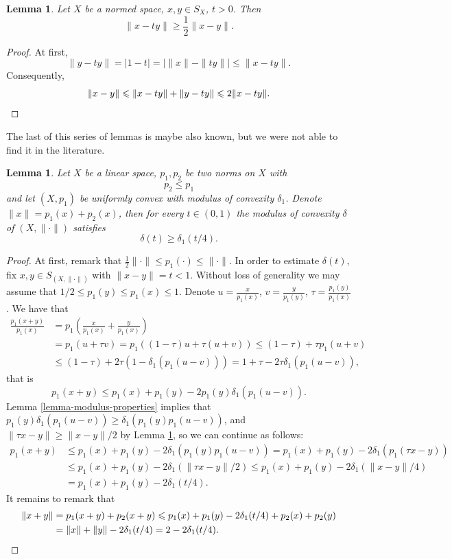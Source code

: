 \documentclass[a4paper,10pt]{amsart}
\theoremstyle{plain}
\newtheorem{lemma}[theorem]{Lemma}
\theoremstyle{definition}
\renewcommand{\geq}{\geqslant}
\renewcommand{\leq}{\leqslant}
\begin{document}
\begin{lemma} \label{lemma-distances}
Let $X$ be a normed space, $x, y \in S_X$, $t > 0$. Then
$$
\|x - ty\| \geq \frac12 \|x - y\|.
$$
\end{lemma}

\begin{proof}
At first,
$$
\|y - ty\| = |1 - t|= \left| \|x\| - \|ty\| \right| \leq \|x - ty\|.
$$
Consequently,
\[
\|x - y\| \leq \|x - ty\| + \|y - ty\| \leq 2  \|x - ty\|.\qedhere
\]
\end{proof}

The last of this series of lemmas is maybe also known, but we were not able to find it in the literature.

\begin{lemma} \label{lemma-sum-of-norms}
Let $X$ be a linear space, $p_1, p_2$ be two norms on $X$ with
$$
p_2 \leq p_1
$$
and let $(X, p_1)$ be uniformly convex with modulus of convexity $\delta_1$. Denote $\|x\| = p_1(x) + p_2(x)$, then for every $t \in (0, 1)$ the modulus of convexity $\delta$ of $(X, \|\cdot\|)$ satisfies
$$
\delta(t) \geq \delta_1( t/ 4).
$$
\end{lemma}
\begin{proof}
At first, remark that $\frac12 \|\cdot\| \leq p_1(\cdot) \leq  \|\cdot\|$. In order to estimate  $\delta(t)$, fix $x, y \in S_{(X, \|\cdot\|)}$ with $\|x - y\| = t < 1$.  Without loss of generality we may assume that $1/2 \leq p_1(y) \leq p_1(x) \leq 1$. Denote $u = \frac{x}{p_1(x)}$, $v = \frac{y}{p_1(y)}$, $\tau = \frac{p_1(y)}{p_1(x)}$. We have that
\begin{align*}
\frac{p_1(x+y) }{ p_1(x)} & =  p_1\left(\frac{x}{ p_1(x)}+\frac{y}{ p_1(x)}\right)  \\
& = p_1\left(u+ \tau v\right) =p_1\left((1 - \tau)u+ \tau (u + v)\right) \leq  (1 - \tau) + \tau p_1(u + v) \\
& \leq (1 - \tau) + 2 \tau (1 - \delta_1(p_1(u - v))) = 1 + \tau -2 \tau \delta_1(p_1(u - v)),
\end{align*}
that is
$$
p_1(x+y) \leq p_1(x) + p_1(y)  - 2 p_1(y)  \delta_1(p_1(u - v)).
$$
Lemma \ref{lemma-modulus-properties} implies that $p_1(y)  \delta_1(p_1(u - v)) \geq \delta_1(p_1(y) p_1(u - v))$, and $\|\tau x - y\| \geq  \|x -  y\| / 2$ by Lemma \ref{lemma-distances}, so we can continue as follows:
\begin{align*}
p_1(x+y) & \leq p_1(x) + p_1(y) - 2 \delta_1(p_1(y) p_1(u - v)) =  p_1(x) + p_1(y) - 2 \delta_1( p_1(\tau x -  y)) \\
&   \leq p_1(x) + p_1(y) - 2 \delta_1( \|\tau x - y\| / 2)  \leq p_1(x) + p_1(y) - 2 \delta_1( \|x -  y\| / 4) \\
& = p_1(x) + p_1(y) - 2 \delta_1( t/ 4).
\end{align*}
It remains to remark that
\begin{align*}
\|x + y\|  &= p_1(x+y) + p_2(x+y) \leq  p_1(x) + p_1(y) - 2 \delta_1( t/ 4)+ p_2(x) +  p_2(y) \\
& = \|x\| + \|y\| - 2 \delta_1( t/ 4) = 2 -  2 \delta_1( t/ 4).\qedhere
\end{align*}
\end{proof}
\end{document}
